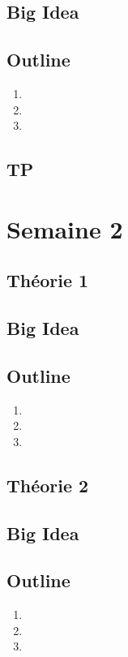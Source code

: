 \documentclass{article}
\begin{document}
\subsection*{Big Idea}
\subsection*{Outline}
\begin{enumerate}
    \item
    \item
    \item
\end{enumerate}
\subsection{TP}

\pagebreak

\section{Semaine 2}
\subsection{Théorie 1}
\subsection*{Big Idea}
\subsection*{Outline}
\begin{enumerate}
    \item
    \item
    \item
\end{enumerate}
\subsection{Théorie 2}
\subsection*{Big Idea}
\subsection*{Outline}
\begin{enumerate}
    \item
    \item
    \item
\end{enumerate}
\end{document}

